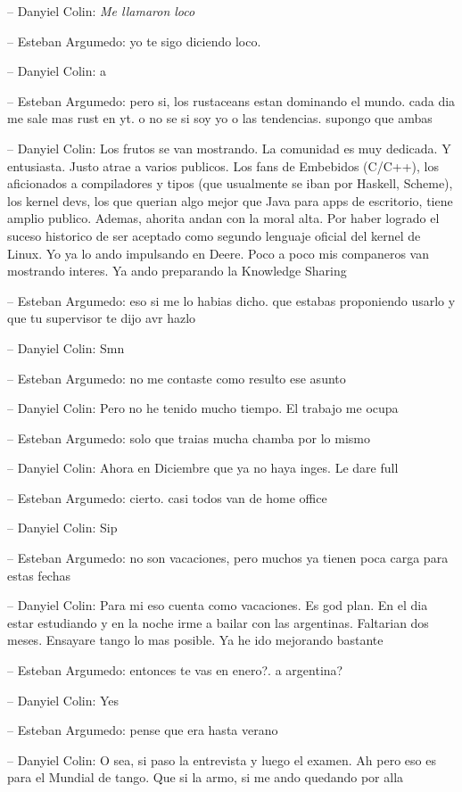 -- Danyiel Colin: \emph{Me llamaron loco}

-- Esteban Argumedo: yo te sigo diciendo loco.

-- Danyiel Colin: a

-- Esteban Argumedo: pero si, los rustaceans estan dominando el mundo.
cada dia me sale mas rust en yt. o no se si soy yo o las tendencias.
supongo que ambas

-- Danyiel Colin: Los frutos se van mostrando. La comunidad es muy
dedicada. Y entusiasta. Justo atrae a varios publicos. Los fans de
Embebidos (C/C++), los aficionados a compiladores y tipos (que
usualmente se iban por Haskell, Scheme), los kernel devs, los que
querian algo mejor que Java para apps de escritorio, tiene amplio
publico. Ademas, ahorita andan con la moral alta. Por haber logrado el
suceso historico de ser aceptado como segundo lenguaje oficial del
kernel de Linux. Yo ya lo ando impulsando en Deere. Poco a poco mis
companeros van mostrando interes. Ya ando preparando la Knowledge
Sharing

-- Esteban Argumedo: eso si me lo habias dicho. que estabas proponiendo
usarlo y que tu supervisor te dijo avr hazlo

-- Danyiel Colin: Smn

-- Esteban Argumedo: no me contaste como resulto ese asunto

-- Danyiel Colin: Pero no he tenido mucho tiempo. El trabajo me ocupa

-- Esteban Argumedo: solo que traias mucha chamba por lo mismo

-- Danyiel Colin: Ahora en Diciembre que ya no haya inges. Le dare full

-- Esteban Argumedo: cierto. casi todos van de home office

-- Danyiel Colin: Sip

-- Esteban Argumedo: no son vacaciones, pero muchos ya tienen poca carga
para estas fechas

-- Danyiel Colin: Para mi eso cuenta como vacaciones. Es god plan. En el
dia estar estudiando y en la noche irme a bailar con las argentinas.
Faltarian dos meses. Ensayare tango lo mas posible. Ya he ido mejorando
bastante

-- Esteban Argumedo: entonces te vas en enero?. a argentina?

-- Danyiel Colin: Yes

-- Esteban Argumedo: pense que era hasta verano

-- Danyiel Colin: O sea, si paso la entrevista y luego el examen. Ah
pero eso es para el Mundial de tango. Que si la armo, si me ando
quedando por alla

